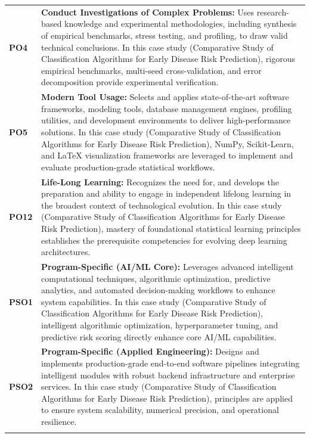{\begin{longtable}{@{}>{\centering\arraybackslash}p{1.8cm} p{13.2cm}@{}}
    \addlinespace
\textbf{PO4} & \textbf{Conduct Investigations of Complex Problems:} Uses research-based knowledge and experimental methodologies, including synthesis of empirical benchmarks, stress testing, and profiling, to draw valid technical conclusions. In this case study (Comparative Study of Classification Algorithms for Early Disease Risk Prediction), rigorous empirical benchmarks, multi-seed cross-validation, and error decomposition provide experimental verification. \\
    \addlinespace
\textbf{PO5} & \textbf{Modern Tool Usage:} Selects and applies state-of-the-art software frameworks, modeling tools, database management engines, profiling utilities, and development environments to deliver high-performance solutions. In this case study (Comparative Study of Classification Algorithms for Early Disease Risk Prediction), NumPy, Scikit-Learn, and LaTeX visualization frameworks are leveraged to implement and evaluate production-grade statistical workflows. \\
    \addlinespace
\textbf{PO12} & \textbf{Life-Long Learning:} Recognizes the need for, and develops the preparation and ability to engage in independent lifelong learning in the broadest context of technological evolution. In this case study (Comparative Study of Classification Algorithms for Early Disease Risk Prediction), mastery of foundational statistical learning principles establishes the prerequisite competencies for evolving deep learning architectures. \\
    \addlinespace
\textbf{PSO1} & \textbf{Program-Specific (AI/ML Core):} Leverages advanced intelligent computational techniques, algorithmic optimization, predictive analytics, and automated decision-making workflows to enhance system capabilities. In this case study (Comparative Study of Classification Algorithms for Early Disease Risk Prediction), intelligent algorithmic optimization, hyperparameter tuning, and predictive risk scoring directly enhance core AI/ML capabilities. \\
    \addlinespace
\textbf{PSO2} & \textbf{Program-Specific (Applied Engineering):} Designs and implements production-grade end-to-end software pipelines integrating intelligent modules with robust backend infrastructure and enterprise services. In this case study (Comparative Study of Classification Algorithms for Early Disease Risk Prediction), principles are applied to ensure system scalability, numerical precision, and operational resilience. \\
    \addlinespace
    \bottomrule
\end{longtable}}